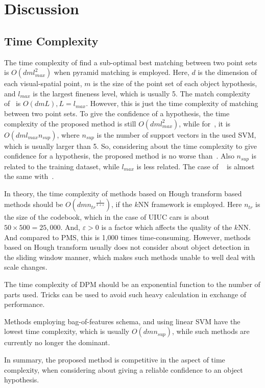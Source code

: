 \documentclass[paper]{ieice}
\begin{document}
\section{Discussion}
\label{dis5}
\subsection{Time Complexity}
The time complexity of find a sub-optimal best matching between two point sets is $O(dml_{max}^2)$ when pyramid matching is employed. Here, $d$ is the dimension of each visual-spatial point, $m$ is the size of the point set of each object hypothesis, and $l_{max}$ is the largest fineness level, which is usually 5. The match complexity of~\cite{pmk} is $O(dmL), L=l_{max}$. However, this is just the time complexity of matching between two point sets. To give the confidence of a hypothesis, the time complexity of the proposed method is still $O(dml_{max}^2)$, while for~\cite{pmk}, it is $O(dml_{max}n_{sup})$, where $n_{sup}$ is the number of support vectors in the used SVM, which is usually larger than 5. So, considering about the time complexity to give confidence for a hypothesis, the proposed method is no worse than~\cite{pmk}. Also $n_{sup}$ is related to the training dataset, while $l_{max}$ is less related. The case of ~\cite{spmk} is almost the same with~\cite{pmk}.

In theory, the time complexity of methods based on Hough transform based methods should be $O(dm{n_{tr}}^{\frac 1 {1+\varepsilon}})$, if the $k$NN framework is employed. Here $n_{tr}$ is the size of the codebook, which in the case of UIUC cars is about $50\times 500=25,000$. And, $\varepsilon > 0$ is a factor which affects the quality of the $k$NN. And compared to PMS, this is 1,000 times time-consuming. However, methods based on Hough transform usually does not consider about object detection in the sliding window manner, which makes such methods unable to well deal with scale changes.

The time complexity of DPM should be an exponential function to the number of parts used. Tricks can be used to avoid such heavy calculation in exchange of performance.

Methods employing bag-of-features schema, and using linear SVM have the lowest time complexity, which is usually  $O(dmn_{sup})$, while such methods are currently no longer the dominant.

In summary, the proposed method is competitive in the aspect of time complexity, when considering about giving a reliable confidence to an object hypothesis.
\end{document}
